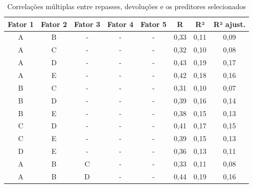 \begin{spacing}{1}
\begin{table}[htb] 
    \centering
    \caption{Correlações múltiplas entre repasses, devoluções e os preditores selecionados}
    \label{tab:correlacaoMultipla_AMAZON}
    \begin{tabular}{|c|c|c|c|c|c|c|c|}
        \hline
        \rowcolor[HTML]{4472C4} 
        {\color[HTML]{FFFFFF} Fator 1} & {\color[HTML]{FFFFFF} Fator 2} & {\color[HTML]{FFFFFF} Fator 3} & {\color[HTML]{FFFFFF} Fator 4} & {\color[HTML]{FFFFFF} Fator 5} & {\color[HTML]{FFFFFF} R} & {\color[HTML]{FFFFFF} R²} & {\color[HTML]{FFFFFF} R² ajust.} \\ \hline
        A & B & - & - & - & \cellcolor[HTML]{E7F4ED}0,33 & \cellcolor[HTML]{EAF5F0}0,11 & \cellcolor[HTML]{E9F4EE}0,09 \\ \hline
        A & C & - & - & - & \cellcolor[HTML]{F4F9F8}0,32 & \cellcolor[HTML]{F5FAF9}0,10 & \cellcolor[HTML]{F5F9F9}0,08 \\ \hline
        A & D & - & - & - & \cellcolor[HTML]{79C78E}0,43 & \cellcolor[HTML]{7DC991}0,19 & \cellcolor[HTML]{6FC386}0,17 \\ \hline
        A & E & - & - & - & \cellcolor[HTML]{87CD9A}0,42 & \cellcolor[HTML]{8CCF9F}0,18 & \cellcolor[HTML]{80CA94}0,16 \\ \hline
        B & C & - & - & - & \cellcolor[HTML]{FCFCFF}0,31 & \cellcolor[HTML]{FCFCFF}0,10 & \cellcolor[HTML]{FCFCFF}0,07 \\ \hline
        B & D & - & - & - & \cellcolor[HTML]{A3D8B2}0,39 & \cellcolor[HTML]{AADBB8}0,16 & \cellcolor[HTML]{A1D7B0}0,14 \\ \hline
        B & E & - & - & - & \cellcolor[HTML]{ADDCBB}0,38 & \cellcolor[HTML]{B4DFC1}0,15 & \cellcolor[HTML]{ACDCBA}0,13 \\ \hline
        C & D & - & - & - & \cellcolor[HTML]{8FD0A1}0,41 & \cellcolor[HTML]{95D3A6}0,17 & \cellcolor[HTML]{8ACE9D}0,15 \\ \hline
        C & E & - & - & - & \cellcolor[HTML]{A5D9B4}0,39 & \cellcolor[HTML]{ACDCBA}0,15 & \cellcolor[HTML]{A3D8B3}0,13 \\ \hline
        D & E & - & - & - & \cellcolor[HTML]{CCE9D6}0,36 & \cellcolor[HTML]{D2EBDB}0,13 & \cellcolor[HTML]{CEEAD7}0,11 \\ \hline
        A & B & C & - & - & \cellcolor[HTML]{E3F2E9}0,33 & \cellcolor[HTML]{E7F4ED}0,11 & \cellcolor[HTML]{F4F9F8}0,08 \\ \hline
        A & B & D & - & - & \cellcolor[HTML]{77C78D}0,44 & \cellcolor[HTML]{7BC890}0,19 & \cellcolor[HTML]{7BC890}0,16 \\ \hline

\end{tabular}
\end{table}
\end{spacing}

